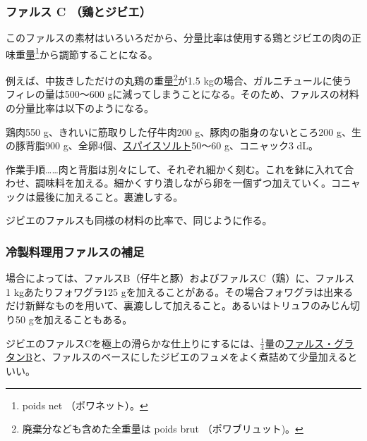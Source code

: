 \begin{recette}
\hypertarget{farce-froide-c}{%
\subsubsection{ファルス C （鶏とジビエ）}\label{farce-froide-c}}



このファルスの素材はいろいろだから、分量比率は使用する鶏とジビエの肉の正味重量\footnote{poids
  net （ポワネット）。}から調節することになる。

例えば、中抜きしただけの丸鶏の重量\footnote{廃棄分なども含めた全重量は
  poids brut （ポワブリュット)。}が1.5
kgの場合、ガルニチュールに使うフィレの量は500〜600
gに減ってしまうことになる。そのため、ファルスの材料の分量比率は以下のようになる。

鶏肉550 g、きれいに筋取りした仔牛肉200 g、豚肉の脂身のないところ200
g、生の豚背脂900
g、全卵4個、\protect\hyperlink{sel-epice}{スパイスソルト}50〜60
g、コニャック3 dL。

作業手順\ldots{}\ldots{}肉と背脂は別々にして、それぞれ細かく刻む。これを鉢に入れて合わせ、調味料を加える。細かくすり潰しながら卵を一個ずつ加えていく。コニャックは最後に加えること。裏漉しする。

ジビエのファルスも同様の材料の比率で、同じように作る。

\atoaki{}

\hypertarget{observation-sur-les-farces}{%
\subsubsection{冷製料理用ファルスの補足}\label{observation-sur-les-farces}}

場合によっては、ファルスB（仔牛と豚）およびファルスC（鶏）に、ファルス 1
kgあたりフォワグラ125
gを加えることがある。その場合フォワグラは出来るだけ新鮮なものを用いて、裏漉しして加えること。あるいはトリュフのみじん切り50
gを加えることもある。

ジビエのファルスCを極上の滑らかな仕上りにするには、\(\frac{1}{4}\)量の\protect\hyperlink{farce-gratin-b}{ファルス・グラタンB}と、ファルスのベースにしたジビエのフュメをよく煮詰めて少量加えるといい。
\end{recette}
